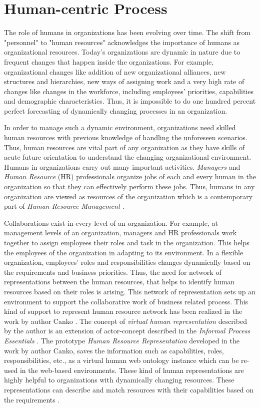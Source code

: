 \section{Human-centric Process}
\label{sec:humancentric}
The role of humans in organizations has been evolving over time. The shift from "personnel" to "human resources" acknowledges the importance of humans as organizational resources. Today's organizations are dynamic in nature due to frequent changes that happen inside the organizations. For example, organizational changes like addition of new organizational alliances, new structures and hierarchies, new ways of assigning work and a very high rate of changes like changes in the workforce, including employees' priorities, capabilities and demographic characteristics. Thus, it is impossible to do one hundred percent perfect forecasting of dynamically changing processes in an organization.

In order to manage such a dynamic environment, organizations need skilled human resources with previous knowledge of handling the unforeseen scenarios. Thus, human resources are vital part of any organization as they have skills of acute future orientation to understand the changing organizational environment. Humans in organizations carry out many important activities. \textit{Managers} and \textit{Human Resource} (HR) professionals organize jobs of each and every human in the organization so that they can effectively perform these jobs. Thus, humans in any organization are viewed as resources of the organization which is a contemporary part of \textit{Human Resource Management} \cite{Bianca2016}.

Collaborations exist in every level of an organization. For example, at management levels of an organization, managers and HR professionals work together to assign employees their roles and task in the organization. This helps the employees of the organization in adapting to its environment. In a flexible organization, employees' roles and responsibilities changes dynamically based on the requirements and business priorities. Thus, the need for network of representations between the human resources, that helps to identify human resources based on their roles is arising. This network of representation sets up an environment to support the collaborative work of business related process. This kind of support to represent human resource network has been realized in the work by author Canko \cite{Canko2015}. The concept of \textit{virtual human representation} described by the author is an extension of actor-concept described in the \textit{Informal Process Essentials} \cite{Sungur2014a}. The prototype \textit{Human Resource Representation} developed in the work by author Canko, saves the information such as capabilities, roles, responsibilities, etc., as a virtual human web ontology instance which can be re-used in the  web-based environments. These kind of human representations are highly helpful to organizations with dynamically changing resources. These representations can describe and match resources with their capabilities based on the requirements \cite{Canko2015}.

